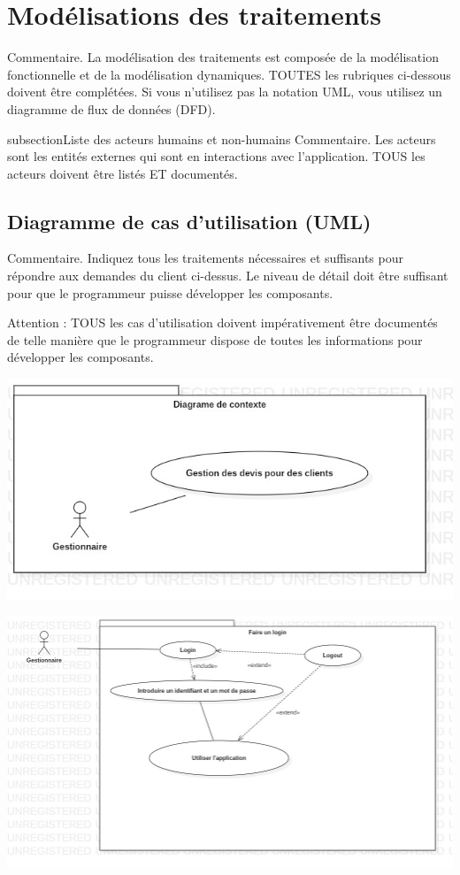 \section{Modélisations des traitements}
Commentaire.  La modélisation des traitements est composée de la modélisation fonctionnelle et de la modélisation dynamiques.  TOUTES les rubriques ci-dessous doivent être complétées.  Si vous n’utilisez pas la notation UML, vous utilisez un diagramme de flux de données (DFD).

subsection{Liste des acteurs humains et non-humains}
Commentaire.  Les acteurs sont les entités externes qui sont en interactions avec l’application.  TOUS les acteurs doivent être listés ET documentés.

\subsection{Diagramme de cas d’utilisation (UML)}
Commentaire.  Indiquez tous les traitements nécessaires et suffisants pour répondre aux demandes du client ci-dessus. Le niveau de détail doit être suffisant pour que le programmeur puisse développer les composants.

Attention :  TOUS les cas d’utilisation doivent impérativement être documentés de telle manière que le programmeur dispose de toutes les informations pour développer les composants.



\begin{center}
\includegraphics[scale=0.7]{use_case/contexte.jpg} 
\end{center}

\begin{center}
\includegraphics[scale=0.5]{use_case/login.jpg}
\end{center}

